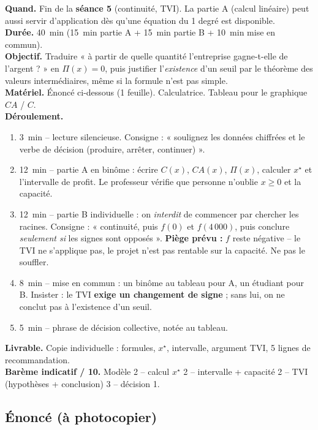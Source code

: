 \documentclass[12pt,a4paper]{article}
\begin{document}
\begin{profbox}
\textbf{Quand.} Fin de la \textbf{séance 5} (continuité, TVI). La partie A (calcul linéaire) peut aussi servir d'application dès qu'une équation du 1 degré est disponible.\\
\textbf{Durée.} 40~min (15~min partie A + 15~min partie B + 10~min mise en commun).\\
\textbf{Objectif.} Traduire « à partir de quelle quantité l'entreprise gagne-t-elle de l'argent ? » en $\Pi(x)=0$, puis justifier l'\emph{existence} d'un seuil par le théorème des valeurs intermédiaires, même si la formule n'est pas simple.\\
\textbf{Matériel.} Énoncé ci-dessous (1 feuille). Calculatrice. Tableau pour le graphique $CA$ / $C$.\\
\textbf{Déroulement.}
\begin{enumerate}[leftmargin=1.3cm]
  \item 3~min -- lecture silencieuse. Consigne : « soulignez les données chiffrées et le verbe de décision (produire, arrêter, continuer) ».
  \item 12~min -- partie A en binôme : écrire $C(x)$, $CA(x)$, $\Pi(x)$, calculer $x^\star$ et l'intervalle de profit. Le professeur vérifie que personne n'oublie $x\geqslant 0$ et la capacité.
  \item 12~min -- partie B individuelle : on \emph{interdit} de commencer par chercher les racines. Consigne : « continuité, puis $f(0)$ et $f(4\,000)$, puis conclure \emph{seulement si} les signes sont opposés ». \textbf{Piège prévu :} $f$ reste négative -- le TVI ne s'applique pas, le projet n'est pas rentable sur la capacité. Ne pas le souffler.
  \item 8~min -- mise en commun : un binôme au tableau pour A, un étudiant pour B. Insister : le TVI \textbf{exige un changement de signe} ; sans lui, on ne conclut pas à l'existence d'un seuil.
  \item 5~min -- phrase de décision collective, notée au tableau.
\end{enumerate}
\textbf{Livrable.} Copie individuelle : formules, $x^\star$, intervalle, argument TVI, 5 lignes de recommandation.\\
\textbf{Barème indicatif / 10.} Modèle 2 -- calcul $x^\star$ 2 -- intervalle + capacité 2 -- TVI (hypothèses + conclusion) 3 -- décision 1.
\end{profbox}

\subsection{Énoncé (à photocopier)}
\end{document}
